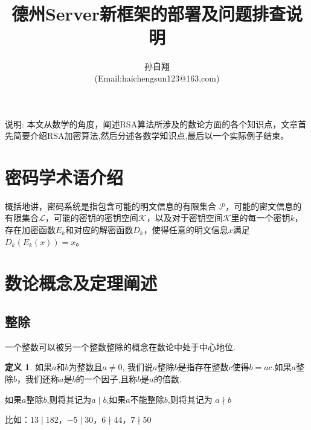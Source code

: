 \documentclass{article}
\title{\huge{德州Server新框架的部署及问题排查说明} }
\author{孙自翔\\[2pt]
(Email:haichengsun123@163.com) \\[2pt]}
\date{}  %
\theoremstyle{definition}
\newtheorem{dfn}{定义}[section]
\theoremstyle{remark}
\theoremstyle{plain}
\begin{document}
\maketitle  %


%


说明: 本文从数学的角度，阐述RSA算法所涉及的数论方面的各个知识点，文章首先简要介绍RSA加密算法,然后分述各数学知识点,最后以一个实际例子结束。

% 
\section{密码学术语介绍}
% 
\hspace*{6mm}
概括地讲\cite{BOOK:1}，密码系统是指包含可能的明文信息的有限集合 $\mathscr{P}$，可能的密文信息的有限集合$\mathscr{L}$，可能的密钥的密钥空间$\mathscr{K}$，以及对于密钥空间$\mathscr{K}$里的每一个密钥$k$，存在加密函数$E_k$和对应的解密函数$D_k$，使得任意的明文信息$x$满足$D_k(E_k(x))=x$。


\section{数论概念及定理阐述}
\subsection{整除}   

一个整数可以被另一个整数整除的概念在数论中处于中心地位.
\begin{dfn}
如果$a$和$b$为整数且$a \neq 0$, 我们说$a$整除$b$是指存在整数$c$使得$b=ac$.如果$a$整除$b$，我们还称$a$是$b$的一个因子,且称$b$是$a$的倍数.
\end{dfn}
如果$a$整除$b$,则将其记为$a \mid b$,如果$a$不能整除$b$,则将其记为 $a \nmid b$

比如：$13 \mid 182$，$-5\mid30$，$6 \nmid 44$，$7 \nmid 50$
\end{document}
